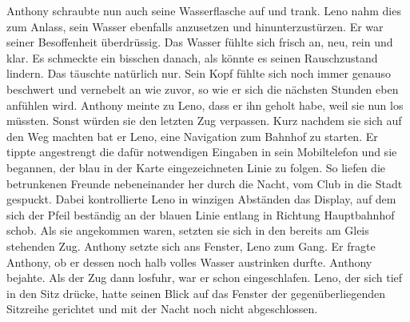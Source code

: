 \documentclass[ngerman,smalldemyvopaper,11pt,oneside,onecolumn,openright,extrafontsizes]{memoir}
\begin{document}
Anthony schraubte nun auch seine Wasserflasche auf und trank. Leno nahm dies zum Anlass, sein Wasser ebenfalls anzusetzen und hinunterzustürzen. Er war seiner Besoffenheit überdrüssig. Das Wasser fühlte sich frisch an, neu, rein und klar. Es schmeckte ein bisschen danach, als könnte es seinen Rauschzustand lindern. Das täuschte natürlich nur. Sein Kopf fühlte sich noch immer genauso beschwert und vernebelt an wie zuvor, so wie er sich die nächsten Stunden eben anfühlen wird. Anthony meinte zu Leno, dass er ihn geholt habe, weil sie nun los müssten. Sonst würden sie den letzten Zug verpassen. Kurz nachdem sie sich auf den Weg machten bat er Leno, eine Navigation zum Bahnhof zu starten. Er tippte angestrengt die dafür notwendigen Eingaben in sein Mobiltelefon und sie begannen, der blau in der Karte eingezeichneten Linie zu folgen. So liefen die betrunkenen Freunde nebeneinander her durch die Nacht, vom Club in die Stadt gespuckt. Dabei kontrollierte Leno in winzigen Abständen das Display, auf dem sich der Pfeil beständig an der blauen Linie entlang in Richtung Hauptbahnhof schob.
Als sie angekommen waren, setzten sie sich in den bereits am Gleis stehenden Zug. Anthony setzte sich ans Fenster, Leno zum Gang. Er fragte Anthony, ob er dessen noch halb volles Wasser austrinken durfte. Anthony bejahte. Als der Zug dann losfuhr, war er schon eingeschlafen. Leno, der sich tief in den Sitz drücke, hatte seinen Blick auf das Fenster der gegenüberliegenden Sitzreihe gerichtet und mit der Nacht noch nicht abgeschlossen.
\end{document}
